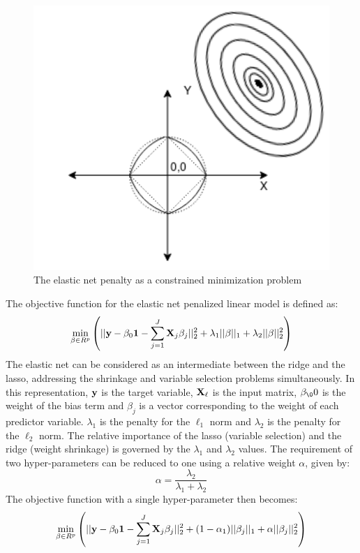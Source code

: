\documentclass[a4paper,12pt]{article}
\def\bX {{\bf X}}
\def\by{{\bf y}}
\def\bone{{\bf 1}}
\begin{document}
\begin{figure}[H]
    \centering
    \includegraphics[scale=0.4]{elastic-net.png}
    \caption{The elastic net penalty as a constrained minimization problem}
    \label{fig:ALAMO Flowchart}
\end{figure}
The objective function for the elastic net penalized linear model is defined as:
\begin{eqnarray}
\label{eq:6}
\min_{\beta\in R^p}\left(||\by-\beta_0\bone-\sum_{j=1}^J
\bX_j\beta_j||_2^2 + \lambda_1 ||\beta||_1 + \lambda_2 ||\beta||_2^2 \right)
\end{eqnarray}
The elastic net \cite{zou2005regularization} can be considered  as an intermediate between the ridge and the lasso, addressing the shrinkage and variable selection problems simultaneously. In this representation, $\by$ is the target variable,  $\bX_\ell$ is the input matrix, $\beta_\00$  is the weight of the bias term and  $\beta_j$  is a vector corresponding to the weight of each predictor variable. $\lambda_1$ is the penalty for the  $\ell_1$ norm and $\lambda_2$  is the penalty for the $\ell_2$ norm. The relative importance of the lasso (variable selection) and the ridge (weight shrinkage) is governed by the $\lambda_1$ and $\lambda_2$ values. The requirement of two hyper-parameters can be reduced to one using a relative weight $\alpha$, given by:
$$\alpha = \frac{\lambda_2} {\lambda_1 + \lambda_2}$$
The objective function with a single hyper-parameter then becomes:
\begin{eqnarray}
\label{eq:6}
\min_{\beta\in R^p}\left(||\by-\beta_0\bone-\sum_{j=1}^J
\bX_j\beta_j||_2^2 + (1 - \alpha_1) ||\beta_j||_1 + \alpha||\beta_j||_2^2 \right)
\end{eqnarray} \\
\end{document}
